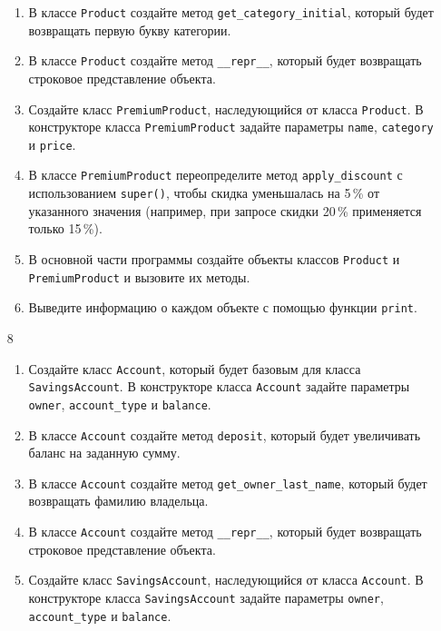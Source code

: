 \begin{enumerate}
\begin{enumerate}[leftmargin=*]
    \item В классе \texttt{Product} создайте метод \texttt{get\_category\_initial}, который будет возвращать первую букву категории.
    
    \item В классе \texttt{Product} создайте метод \texttt{\_\_repr\_\_}, который будет возвращать строковое представление объекта.
    
    \item Создайте класс \texttt{PremiumProduct}, наследующийся от класса \texttt{Product}. В конструкторе класса \texttt{PremiumProduct} задайте параметры \texttt{name}, \texttt{category} и \texttt{price}.
    
    \item В классе \texttt{PremiumProduct} переопределите метод \texttt{apply\_discount} с использованием \texttt{super()}, чтобы скидка уменьшалась на 5\,\% от указанного значения (например, при запросе скидки 20\,\% применяется только 15\,\%).
    
    \item В основной части программы создайте объекты классов \texttt{Product} и \texttt{PremiumProduct} и вызовите их методы.
    
    \item Выведите информацию о каждом объекте с помощью функции \texttt{print}.
\end{enumerate}

\item[8] 
\begin{enumerate}[leftmargin=*]
    \item Создайте класс \texttt{Account}, который будет базовым для класса \texttt{SavingsAccount}. В конструкторе класса \texttt{Account} задайте параметры \texttt{owner}, \texttt{account\_type} и \texttt{balance}.
    
    \item В классе \texttt{Account} создайте метод \texttt{deposit}, который будет увеличивать баланс на заданную сумму.
    
    \item В классе \texttt{Account} создайте метод \texttt{get\_owner\_last\_name}, который будет возвращать фамилию владельца.
    
    \item В классе \texttt{Account} создайте метод \texttt{\_\_repr\_\_}, который будет возвращать строковое представление объекта.
    
    \item Создайте класс \texttt{SavingsAccount}, наследующийся от класса \texttt{Account}. В конструкторе класса \texttt{SavingsAccount} задайте параметры \texttt{owner}, \texttt{account\_type} и \texttt{balance}.
    

\end{enumerate}
\end{enumerate}
